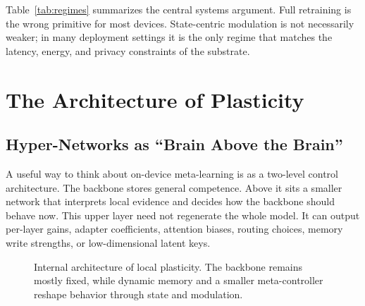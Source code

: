 \documentclass[11pt,a4paper]{article}
\begin{document}
Table~\ref{tab:regimes} summarizes the central systems argument. Full retraining is the wrong primitive for most devices. State-centric modulation is not necessarily weaker; in many deployment settings it is the only regime that matches the latency, energy, and privacy constraints of the substrate.

\section{The Architecture of Plasticity}

\subsection{Hyper-Networks as ``Brain Above the Brain''}

A useful way to think about on-device meta-learning is as a two-level control architecture. The backbone stores general competence. Above it sits a smaller network that interprets local evidence and decides how the backbone should behave now. This upper layer need not regenerate the whole model. It can output per-layer gains, adapter coefficients, attention biases, routing choices, memory write strengths, or low-dimensional latent keys.

\begin{figure}[t]
\centering
{}
\caption{Internal architecture of local plasticity. The backbone remains mostly fixed, while dynamic memory and a smaller meta-controller reshape behavior through state and modulation.}
\label{fig:plasticity_arch}
\end{figure}
\end{document}
